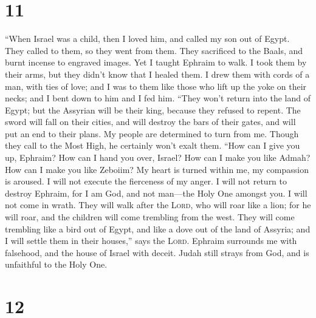 \hypertarget{section-10}{%
\section{11}\label{section-10}}

 ``When Israel was a child, then I loved him, and called
my son out of Egypt.  They called to them, so they went
from them. They sacrificed to the Baals, and burnt incense to engraved
images.  Yet I taught Ephraim to walk. I took them by
their arms, but they didn't know that I healed them.  I
drew them with cords of a man, with ties of love; and I was to them like
those who lift up the yoke on their necks; and I bent down to him and I
fed him.  ``They won't return into the land of Egypt; but
the Assyrian will be their king, because they refused to repent.
 The sword will fall on their cities, and will destroy the
bars of their gates, and will put an end to their plans. 
My people are determined to turn from me. Though they call to the Most
High, he certainly won't exalt them.  ``How can I give you
up, Ephraim? How can I hand you over, Israel? How can I make you like
Admah? How can I make you like Zeboiim? My heart is turned within me, my
compassion is aroused.  I will not execute the fierceness
of my anger. I will not return to destroy Ephraim, for I am God, and not
man---the Holy One amongst you. I will not come in wrath.
 They will walk after the \textsc{Lord}, who will roar
like a lion; for he will roar, and the children will come trembling from
the west.  They will come trembling like a bird out of
Egypt, and like a dove out of the land of Assyria; and I will settle
them in their houses,'' says the \textsc{Lord}.  Ephraim
surrounds me with falsehood, and the house of Israel with deceit. Judah
still strays from God, and is unfaithful to the Holy One.

\hypertarget{section-11}{%
\section{12}\label{section-11}}


